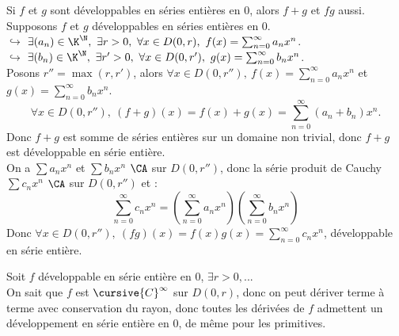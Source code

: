 \documentclass[11pt]{article}
\begin{document}
\begin{prop}{}{}
    Si $f$ et $g$ sont développables en séries entières en $0$, alors $f+g$ et $fg$ aussi.
    \tcblower
    Supposons $f$ et $g$ développables en séries entières en $0$.\\
    $\hookrightarrow$ $\exists (a_n)\in\K^\N, ~ \exists r>0, ~ \forall x \in D(0,r), ~ f(x)=\sum_{n=0}^\infty a_nx^n$.\\
    $\hookrightarrow$ $\exists (b_n)\in\K^\N, ~ \exists r'>0, ~ \forall x \in D(0,r'), ~ g(x)=\sum_{n=0}^\infty b_nx^n$.\\
    Posons $r''=\max(r,r')$, alors $\forall x \in D(0,r''), ~ f(x)=\sum_{n=0}^\infty a_nx^n$ et $g(x)=\sum_{n=0}^\infty b_nx^n$.
    \begin{equation*}
        \forall x \in D(0,r''), ~ (f+g)(x) = f(x) + g(x) = \sum_{n=0}^\infty(a_n+b_n)x^n.
    \end{equation*}
    Donc $f+g$ est somme de séries entières sur un domaine non trivial, donc $f+g$ est développable en série entière.\\
    On a $\sum a_nx^n$ et $\sum b_nx^n$ $\CA$ sur $D(0,r'')$, donc la série produit de Cauchy $\sum c_nx^n$ $\CA$ sur $D(0,r'')$ et :
    \begin{equation*}
        \sum_{n=0}^\infty c_nx^n = \left( \sum_{n=0}^\infty a_nx^n \right)\left( \sum_{n=0}^\infty b_nx^n \right)
    \end{equation*}
    Donc $\forall x \in D(0,r''), ~ (fg)(x)=f(x)g(x)=\sum_{n=0}^\infty c_nx^n$, développable en série entière.
\end{prop}

\begin{prop}{}{}
    Soit $f$ développable en série entière en 0, $\exists r>0, ...$\\
    On sait que $f$ est $\cursive{C}^\infty$ sur $D(0,r)$, donc on peut dériver terme à terme avec conservation du rayon, donc toutes les dérivées de $f$ admettent un développement en série entière en 0, de même pour les primitives.
\end{prop}

\pagebreak
\end{document}
